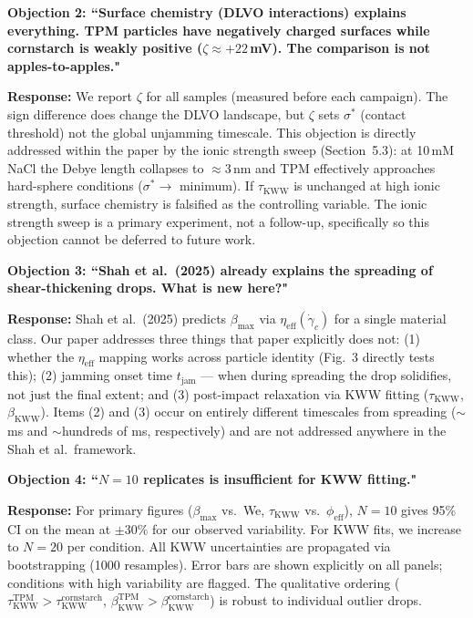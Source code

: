 \documentclass[11pt,letterpaper]{article}
\newcommand{\phieff}{\phi_{\mathrm{eff}}}
\newcommand{\taukww}{\tau_{\mathrm{KWW}}}
\newcommand{\tjam}{t_{\mathrm{jam}}}
\newcommand{\etaeff}{\eta_{\mathrm{eff}}}
\newcommand{\gamcrit}{\dot{\gamma}_c}
\newcommand{\betamax}{\beta_{\max}}
\newcommand{\bkww}{\beta_{\mathrm{KWW}}}
\newcommand{\sigstar}{\sigma^*}
\begin{document}
\begin{reviewbox}
\textbf{Objection 2: ``Surface chemistry (DLVO interactions) explains everything.
TPM particles have negatively charged surfaces while cornstarch is
weakly positive ($\zeta \approx +22$\,mV). The comparison is not
apples-to-apples."}

\textbf{Response:}
We report $\zeta$ for all samples (measured before each campaign). The sign
difference does change the DLVO landscape, but $\zeta$ sets $\sigstar$
(contact threshold) not the global unjamming timescale. This objection is
directly addressed within the paper by the ionic strength sweep
(Section~5.3): at 10\,mM NaCl the Debye length collapses to ${\approx}3$\,nm
and TPM effectively approaches hard-sphere conditions ($\sigstar \to$ minimum).
If $\taukww$ is unchanged at high ionic strength, surface chemistry is
falsified as the controlling variable. The ionic strength sweep is a primary
experiment, not a follow-up, specifically so this objection cannot be deferred
to future work.
\end{reviewbox}

\begin{reviewbox}
\textbf{Objection 3: ``Shah et al.\ (2025) already explains the spreading of
shear-thickening drops. What is new here?"}

\textbf{Response:}
Shah et al.\ (2025) \cite{Mobaseri2025} predicts $\betamax$ via
$\etaeff(\gamcrit)$ for a single material class. Our paper addresses three
things that paper explicitly does not: (1) whether the $\etaeff$ mapping
works across particle identity (Fig.~3 directly tests this); (2) jamming
onset time $\tjam$ --- when during spreading the drop solidifies, not just
the final extent; and (3) post-impact relaxation via KWW fitting ($\taukww$,
$\bkww$). Items (2) and (3) occur on entirely different timescales from
spreading (${\sim}$ms and ${\sim}$hundreds of ms, respectively) and are not
addressed anywhere in the Shah et al.\ framework.
\end{reviewbox}

\begin{reviewbox}
\textbf{Objection 4: ``$N=10$ replicates is insufficient for KWW fitting."}

\textbf{Response:}
For primary figures ($\betamax$ vs.\ We, $\taukww$ vs.\ $\phieff$), $N=10$
gives 95\% CI on the mean at $\pm 30\%$ for our observed variability.
For KWW fits, we increase to $N=20$ per condition. All KWW uncertainties
are propagated via bootstrapping (1000 resamples). Error bars are shown
explicitly on all panels; conditions with high variability are flagged.
The qualitative ordering ($\taukww^\mathrm{TPM} > \taukww^\mathrm{cornstarch}$,
$\bkww^\mathrm{TPM} > \bkww^\mathrm{cornstarch}$) is robust to individual
outlier drops.
\end{reviewbox}
\end{document}
